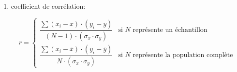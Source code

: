 \documentclass{article}
\begin{document}
\begin{enumerate}
\vspace{0.25cm}

Âge\\[0.15cm]
\begin{center}
\begin{tabular}{ |c|c|c|c|c|c|c|c|} 
    \hline
    \(x_i\) & 23 & 27 & 39 & 41 &47 &49 & 50\\
    \hline
    \(Z\) & -1.77 & -1.47 & -0.56 & -0.41 & 0.04 & 0.19 & 0.26  \\
    \hline
    \(x_i\) & 52 & 54 & 56 & 57 & 58 & 60 & 61\\
    \hline
    \(Z\) & 0.42 & 0.57 & 0.73 & 0.79 & 0.87 & 1.02 & 1.10  \\
    \hline
\end{tabular}
\end{center}

\vspace{0.25cm}

Graisse\\[0.15cm]
\begin{center}
\begin{tabular}{ |c|c|c|c|c|c|c|c|c|c|} 
    \hline
    \(y_i\) & 7.8 & 9.5 & 17.8 & 25.9 & 26.5  & 27.2 & 27.4 & 28.8 & 30.2\\  
    \hline
    \(Z\) & -2.26 & -2.08 & -1.18 & -0.31 & -0.24 & -0.17  & -0.14 & 0.002 & 0.15  \\
    \hline
    \(y_i\) & 31.2 & 31.4 &  32.9 & 33.4 & 34.1 & 34.6 & 35.7 & 41.2 & 42.5\\ 
    \hline
    \(Z\) & 0.26 & 0.28 & 0.44 & 0.49 & 0.57 & 0.62 & 0.74 & 1.34 & 1.48 \\
    \hline
\end{tabular}
\end{center}

\newpage
\item coefficient de corrélation:

\[
    r = 
    \begin{cases}
       \dfrac{\sum (x_i - \overline{x}) \cdot (y_i - \overline{y})}{(N-1) \cdot (\sigma_x \cdot \sigma_y)} & \text{si } N \text{ représente un échantillon} \\[0.75cm]
         \dfrac{\sum (x_i - \overline{x}) \cdot (y_i - \overline{y})}{N \cdot (\sigma_x \cdot \sigma_y)} & \text{si } N \text{ représente la population complète}
    \end{cases}
\]


\vspace{0.25cm}


\end{enumerate}
\end{document}
